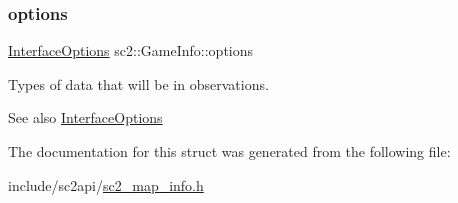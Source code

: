 \subsubsection{\texorpdfstring{options}{options}}
{\footnotesize\ttfamily \hyperlink{structsc2_1_1_interface_options}{Interface\+Options} sc2\+::\+Game\+Info\+::options}

Types of data that will be in observations. \begin{DoxySeeAlso}{See also}
\hyperlink{structsc2_1_1_interface_options}{Interface\+Options} 
\end{DoxySeeAlso}


The documentation for this struct was generated from the following file\+:\begin{DoxyCompactItemize}
\item 
include/sc2api/\hyperlink{sc2__map__info_8h}{sc2\+\_\+map\+\_\+info.\+h}\end{DoxyCompactItemize}
